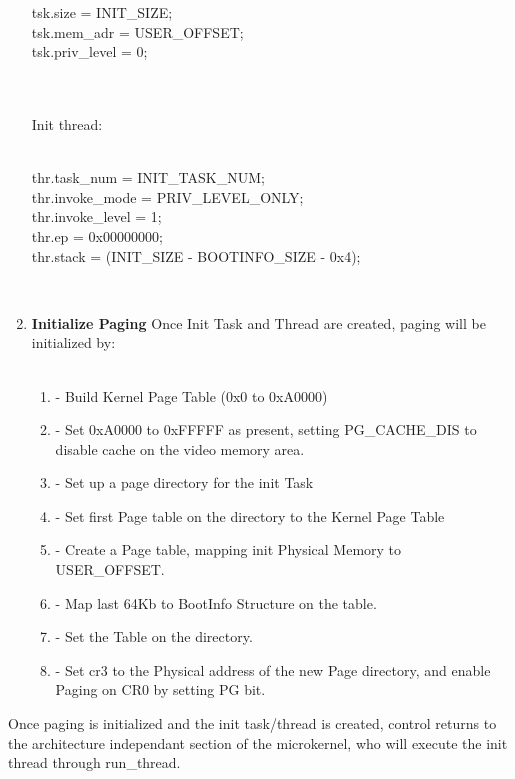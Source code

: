 \documentclass[11pt, letterpaper, twoside, english]{book}
\begin{document}
\begin{enumerate}
\begin{sf} 
\indent tsk.size = INIT\_SIZE;\\
\indent tsk.mem\_adr = USER\_OFFSET;\\
\indent tsk.priv\_level = 0;\\
\end{sf}\\
\\
Init thread:\\
\\
\begin{sf} 
\indent thr.task\_num = INIT\_TASK\_NUM;\\
\indent thr.invoke\_mode = PRIV\_LEVEL\_ONLY;\\
\indent thr.invoke\_level = 1;\\
\indent thr.ep = 0x00000000;\\
\indent thr.stack = (INIT\_SIZE - BOOTINFO\_SIZE - 0x4);\\
\end{sf}\\
\item[]\textbf{Initialize Paging} Once Init Task and Thread are created, paging will be initialized by:\\
\\
\begin{enumerate}
\item[] - Build Kernel Page Table (0x0 to 0xA0000)
\item[] - Set 0xA0000 to 0xFFFFF as present, setting PG\_CACHE\_DIS to disable cache on the video memory area.\\
\item[] - Set up a page directory for the init Task
\item[] - Set first Page table on the directory to the Kernel Page Table
\item[] - Create a Page table, mapping init Physical Memory to USER\_OFFSET.
\item[] - Map last 64Kb to BootInfo Structure on the table.
\item[] - Set the Table on the directory.
\item[] - Set cr3 to the Physical address of the new Page directory, and enable Paging on CR0 by setting PG bit.
\end{enumerate}
\end{enumerate}

Once paging is initialized and the init task/thread is created, control returns to the architecture independant section of the microkernel, who will execute the init thread through \textsf{run\_thread}.
\end{document}

